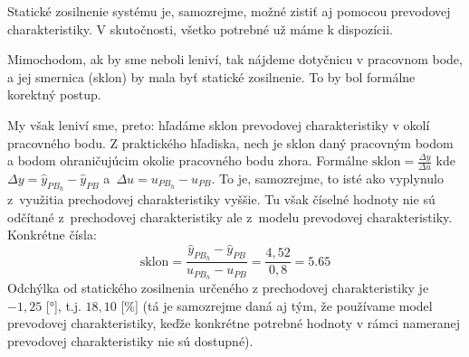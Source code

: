 \documentclass[a4paper, 10pt, ]{article}
\begin{document}
\begin{figure}[t]
	\centering


    \vspace{-4mm}

	\caption{}
	\label{graf20}

\end{figure}




Statické zosilnenie systému je, samozrejme, možné zistiť aj pomocou prevodovej charakteristiky. V skutočnosti, všetko potrebné už máme k dispozícii.

Mimochodom, ak by sme neboli leniví, tak nájdeme dotyčnicu v pracovnom bode, a jej smernica (sklon) by mala byť statické zosilnenie. To by bol formálne korektný postup.

My však leniví sme, preto: hľadáme sklon prevodovej charakteristiky v okolí pracovného bodu. Z praktického hľadiska, nech je sklon daný pracovným bodom a bodom ohraničujúcim okolie pracovného bodu zhora. Formálne $\text{sklon} = \frac{\Delta y}{\Delta u}$ kde $\Delta y = \hat y_{PB_h} - \hat y_{PB}$ a~$\Delta u = u_{PB_h} - u_{PB}$. To je, samozrejme, to isté ako vyplynulo z~využitia prechodovej charakteristiky vyššie. Tu však číselné hodnoty nie sú odčítané z~prechodovej charakteristiky ale z~modelu prevodovej charakteristiky. Konkrétne čísla:
\begin{equation}
    \text{sklon} = \frac{\hat y_{PB_h} - \hat y_{PB}}{u_{PB_h} - u_{PB}} = \frac{4,52}{0,8} = 5.65
\end{equation}
Odchýlka od statického zosilnenia určeného z prechodovej charakteristiky je $-1,25$ [°], t.j. $18,10$ [\%] (tá je samozrejme daná aj tým, že používame model prevodovej charakteristiky, keďže konkrétne potrebné hodnoty v rámci nameranej prevodovej charakteristiky nie sú dostupné).
\end{document}
